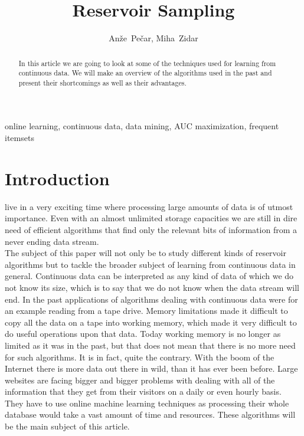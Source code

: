 \documentclass[journal]{IEEEtran/IEEEtran}
\begin{document}
\title{Reservoir Sampling}

\author{Anže~Pečar, Miha~Zidar}%
\maketitle
\begin{abstract}
In this article we are going to look at some of the techniques used for learning from continuous data. We will make an overview of the algorithms used in the past and present their shortcomings as well as their advantages. 
\end{abstract}

\begin{IEEEkeywords}
online learning, continuous data, data mining, AUC maximization, frequent itemsets
\end{IEEEkeywords}

\IEEEpeerreviewmaketitle


\section{Introduction}
 live in a very exciting time where processing large amounts of data is of utmost importance. Even with an almost unlimited storage capacities we are still in dire need of efficient algorithms that find only the relevant bits of information from a never ending data stream.\\

The subject of this paper will not only be to study different kinds of reservoir algorithms but to tackle the broader subject of learning from continuous data in general. Continuous data can be interpreted as any kind of data of which we do not know its size, which is to say that we do not know when the data stream will end. In the past applications of algorithms dealing with continuous data were for an example reading from a tape drive. Memory limitations made it difficult to copy all the data on a tape into working memory, which made it very difficult to do useful operations upon that data. Today working memory is no longer as limited as it was in the past, but that does not mean that there is no more need for such algorithms. It is in fact, quite the contrary. With the boom of the Internet there is more data out there in wild, than it has ever been before. Large websites are facing bigger and bigger problems with dealing with all of the information that they get from their visitors on a daily or even hourly basis. They have to use online machine learning techniques as processing their whole database would take a vast amount of time and resources. These algorithms will be the main subject of this article.\\
\end{document}
